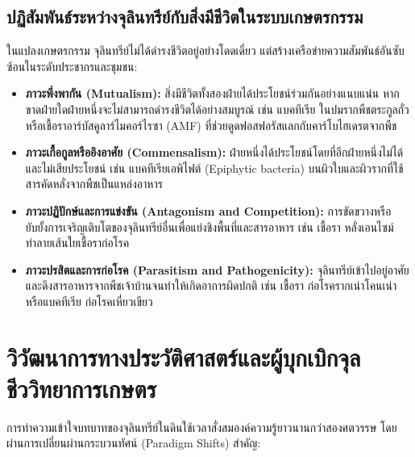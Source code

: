 \subsection{ปฏิสัมพันธ์ระหว่างจุลินทรีย์กับสิ่งมีชีวิตในระบบเกษตรกรรม}

ในแปลงเกษตรกรรม จุลินทรีย์ไม่ได้ดำรงชีวิตอยู่อย่างโดดเดี่ยว แต่สร้างเครือข่ายความสัมพันธ์อันซับซ้อนในระดับประชากรและชุมชน:

\begin{itemize}
    \item \textbf{ภาวะพึ่งพากัน (Mutualism):} สิ่งมีชีวิตทั้งสองฝ่ายได้ประโยชน์ร่วมกันอย่างแนบแน่น หากขาดฝ่ายใดฝ่ายหนึ่งจะไม่สามารถดำรงชีวิตได้อย่างสมบูรณ์ เช่น แบคทีเรีย  ในปมรากพืชตระกูลถั่ว หรือเชื้อราอาร์บัสคูลาร์ไมคอร์ไรซา (AMF) ที่ช่วยดูดฟอสฟอรัสแลกกับคาร์โบไฮเดรตจากพืช
    \item \textbf{ภาวะเกื้อกูลหรืออิงอาศัย (Commensalism):} ฝ่ายหนึ่งได้ประโยชน์โดยที่อีกฝ่ายหนึ่งไม่ได้และไม่เสียประโยชน์ เช่น แบคทีเรียเอพิไฟต์ (Epiphytic bacteria) บนผิวใบและผิวรากที่ใช้สารคัดหลั่งจากพืชเป็นแหล่งอาหาร
    \item \textbf{ภาวะปฏิปักษ์และการแข่งขัน (Antagonism and Competition):} การขัดขวางหรือยับยั้งการเจริญเติบโตของจุลินทรีย์อื่นเพื่อแย่งชิงพื้นที่และสารอาหาร เช่น เชื้อรา  หลั่งเอนไซม์ทำลายเส้นใยเชื้อราก่อโรค
    \item \textbf{ภาวะปรสิตและการก่อโรค (Parasitism and Pathogenicity):} จุลินทรีย์เข้าไปอยู่อาศัยและดึงสารอาหารจากพืชเจ้าบ้านจนทำให้เกิดอาการผิดปกติ เช่น เชื้อรา  ก่อโรครากเน่าโคนเน่า หรือแบคทีเรีย  ก่อโรคเหี่ยวเขียว
\end{itemize}

\section{วิวัฒนาการทางประวัติศาสตร์และผู้บุกเบิกจุลชีววิทยาการเกษตร}

การทำความเข้าใจบทบาทของจุลินทรีย์ในดินใช้เวลาสั่งสมองค์ความรู้ยาวนานกว่าสองศตวรรษ โดยผ่านการเปลี่ยนผ่านกระบวนทัศน์ (Paradigm Shifts) สำคัญ:

